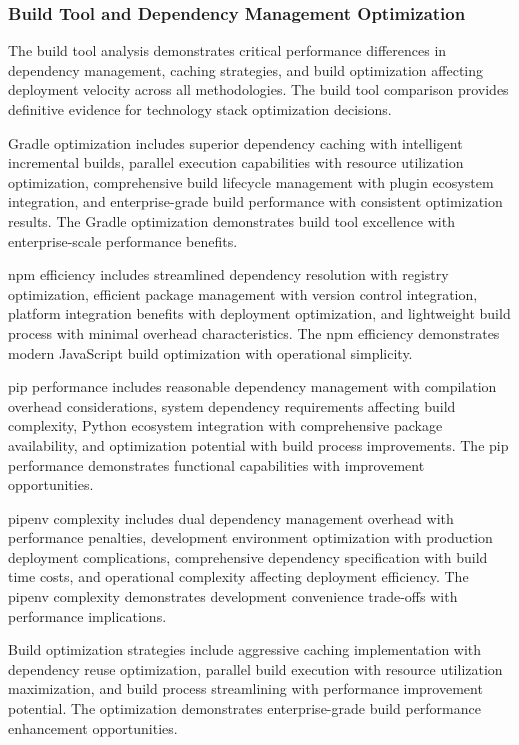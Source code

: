 \subsubsection{Build Tool and Dependency Management Optimization}

The build tool analysis demonstrates critical performance differences in dependency management, caching strategies, and build optimization affecting deployment velocity across all methodologies. The build tool comparison provides definitive evidence for technology stack optimization decisions.

Gradle optimization includes superior dependency caching with intelligent incremental builds, parallel execution capabilities with resource utilization optimization, comprehensive build lifecycle management with plugin ecosystem integration, and enterprise-grade build performance with consistent optimization results. The Gradle optimization demonstrates build tool excellence with enterprise-scale performance benefits.

npm efficiency includes streamlined dependency resolution with registry optimization, efficient package management with version control integration, platform integration benefits with deployment optimization, and lightweight build process with minimal overhead characteristics. The npm efficiency demonstrates modern JavaScript build optimization with operational simplicity.

pip performance includes reasonable dependency management with compilation overhead considerations, system dependency requirements affecting build complexity, Python ecosystem integration with comprehensive package availability, and optimization potential with build process improvements. The pip performance demonstrates functional capabilities with improvement opportunities.

pipenv complexity includes dual dependency management overhead with performance penalties, development environment optimization with production deployment complications, comprehensive dependency specification with build time costs, and operational complexity affecting deployment efficiency. The pipenv complexity demonstrates development convenience trade-offs with performance implications.

Build optimization strategies include aggressive caching implementation with dependency reuse optimization, parallel build execution with resource utilization maximization, and build process streamlining with performance improvement potential. The optimization demonstrates enterprise-grade build performance enhancement opportunities.

